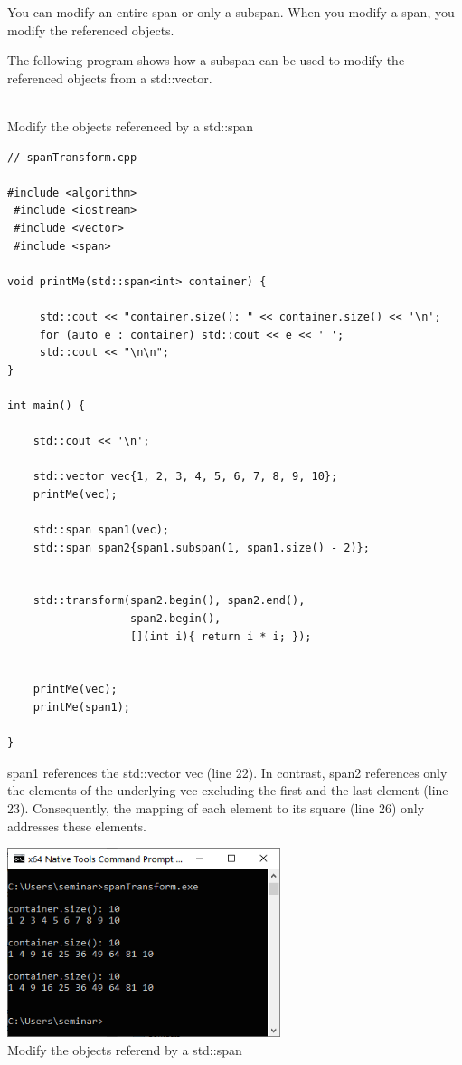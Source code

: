 
You can modify an entire span or only a subspan. When you modify a span, you modify the referenced objects.

The following program shows how a subspan can be used to modify the referenced objects from a std::vector.

\hspace*{\fill} \\ %
\noindent
Modify the objects referenced by a std::span
\begin{lstlisting}[style=styleCXX]
// spanTransform.cpp

#include <algorithm>
 #include <iostream>
 #include <vector>
 #include <span>

void printMe(std::span<int> container) {
	
	 std::cout << "container.size(): " << container.size() << '\n';
	 for (auto e : container) std::cout << e << ' ';
	 std::cout << "\n\n";
}

int main() {

	std::cout << '\n';
	
	std::vector vec{1, 2, 3, 4, 5, 6, 7, 8, 9, 10};
	printMe(vec);
	
	std::span span1(vec);
	std::span span2{span1.subspan(1, span1.size() - 2)};
	
	
	std::transform(span2.begin(), span2.end(),
	               span2.begin(),
	               [](int i){ return i * i; });
	
	
	printMe(vec);
	printMe(span1);

}
\end{lstlisting}

span1 references the std::vector vec (line 22). In contrast, span2 references only the elements of the underlying vec excluding the first and the last element (line 23). Consequently, the mapping of each element to its square (line 26) only addresses these elements.

\begin{center}
\includegraphics[width=0.6\textwidth]{content/3/chapter5/images/7.png}\\
Modify the objects referend by a std::span
\end{center}

